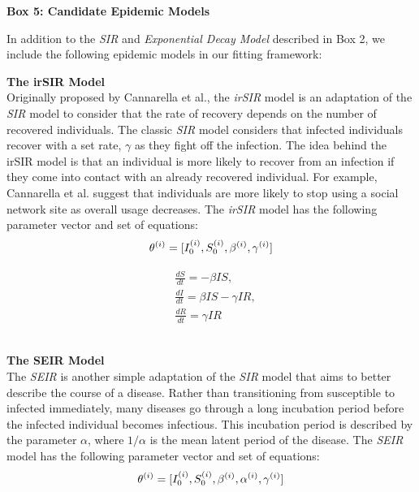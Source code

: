 \newpage
\begin{framed}
{\begin{center}{\bf Box 5: Candidate Epidemic Models}\end{center}}
In addition to the \emph{SIR} and \emph{Exponential Decay Model}
described in Box 2, we include the following epidemic models in our
fitting framework:

{\bf The irSIR Model}\\
Originally proposed by Cannarella et al., the \emph{irSIR}
model is an adaptation of the \emph{SIR} model to consider that the
rate of recovery depends on the number of recovered
individuals. The classic \emph{SIR} model considers that infected
individuals recover with a set rate, $\gamma$ as they fight off the
infection. The idea behind the irSIR model is that an individual is
more likely to recover from an infection if they come into contact
with an already recovered individual. For example, Cannarella et
al. suggest that individuals are more likely to stop using a social
network site as overall usage decreases. The \emph{irSIR} model has the following parameter vector and set of
equations:
\begin{equation}
\centering \theta^{(i)} = [I_0^{(i)},
  S_0^{(i)}, \beta^{(i)}, \gamma^{(i)}]
\end{equation}
\begin{centering}
\begin{equation}
	\begin{split}
	&\frac{dS}{dt} = -\beta IS, \\
	&\frac{dI}{dt} = \beta IS - \gamma IR, \\
	&\frac{dR}{dt} = \gamma IR
	\end{split}
\end{equation}
\end{centering}\\
{\bf The SEIR Model}\\
The \emph{SEIR} is another simple adaptation of the \emph{SIR} model
that aims to better describe the course of a disease. Rather than
transitioning from susceptible to infected immediately, many diseases
go through a long incubation period before the infected individual
becomes infectious.\cite{aron} This incubation period is described by
the parameter $\alpha$, where $1/\alpha$ is the mean latent period of
the disease. The \emph{SEIR} model has the following parameter vector
and set of equations:
\begin{equation}\centering\theta^{(i)} = [I_0^{(i)},
  S_0^{(i)}, \beta^{(i)}, \alpha^{(i)}, \gamma^{(i)}]\end{equation} 

\end{framed}
